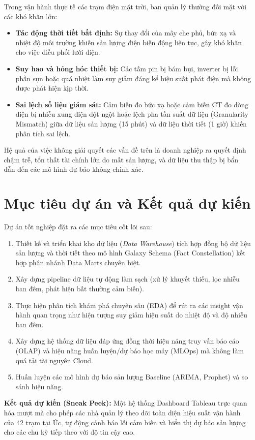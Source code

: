 \documentclass[12pt, a4paper]{report}
\begin{document}
Trong vận hành thực tế các trạm điện mặt trời, ban quản lý thường đối mặt với các khó khăn lớn:
\begin{itemize}[noitemsep]
    \item \textbf{Tác động thời tiết bất định:} Sự thay đổi của mây che phủ, bức xạ và nhiệt độ môi trường khiến sản lượng điện biến động liên tục, gây khó khăn cho việc điều phối lưới điện.
    \item \textbf{Suy hao và hỏng hóc thiết bị:} Các tấm pin bị bám bụi, inverter bị lỗi phần sụn hoặc quá nhiệt làm suy giảm đáng kể hiệu suất phát điện mà không được phát hiện kịp thời.
    \item \textbf{Sai lệch số liệu giám sát:} Cảm biến đo bức xạ hoặc cảm biến CT đo dòng điện bị nhiễu xung điện đột ngột hoặc lệch pha tần suất dữ liệu (Granularity Mismatch) giữa dữ liệu sản lượng (15 phút) và dữ liệu thời tiết (1 giờ) khiến phân tích sai lệch.
\end{itemize}
Hệ quả của việc không giải quyết các vấn đề trên là doanh nghiệp ra quyết định chậm trễ, tổn thất tài chính lớn do mất sản lượng, và dữ liệu thu thập bị bẩn dẫn đến các mô hình dự báo không chính xác.

\section{Mục tiêu dự án và Kết quả dự kiến}
\label{sec:muctieu}

Dự án tốt nghiệp đặt ra các mục tiêu cốt lõi sau:
\begin{enumerate}[noitemsep]
    \item Thiết kế và triển khai kho dữ liệu (\textit{Data Warehouse}) tích hợp đồng bộ dữ liệu sản lượng và thời tiết theo mô hình Galaxy Schema (Fact Constellation) kết hợp phân nhánh Data Marts chuyên biệt.
    \item Xây dựng pipeline dữ liệu tự động làm sạch (xử lý khuyết thiếu, lọc nhiễu ban đêm, phát hiện bất thường cảm biến).
    \item Thực hiện phân tích khám phá chuyên sâu (EDA) để rút ra các insight vận hành quan trọng như hiện tượng suy giảm hiệu suất do nhiệt độ và độ nhiễu ban đêm.
    \item Xây dựng hệ thống dữ liệu đáp ứng đồng thời hiệu năng truy vấn báo cáo (OLAP) và hiệu năng huấn luyện/dự báo học máy (MLOps) mà không làm quá tải tài nguyên Cloud.
    \item Huấn luyện các mô hình dự báo sản lượng Baseline (ARIMA, Prophet) và so sánh hiệu năng.
\end{enumerate}
\textbf{Kết quả dự kiến (Sneak Peek):} Một hệ thống Dashboard Tableau trực quan hóa mượt mà cho phép các nhà quản lý theo dõi toàn diện hiệu suất vận hành của 42 trạm tại Úc, tự động cảnh báo lỗi cảm biến và hiển thị dự báo sản lượng cho các chu kỳ tiếp theo với độ tin cậy cao.
\end{document}
